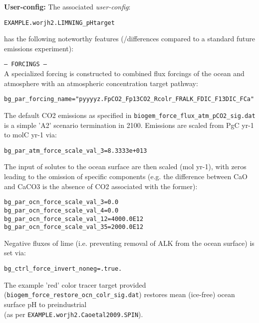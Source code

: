 \documentclass[10pt,twoside]{article}
\begin{document}
\noindent \textbf{User-config:} The associated \textit{user-config}:
\vspace{-10pt}\begin{verbatim}EXAMPLE.worjh2.LIMNING_pHtarget\end{verbatim}\vspace{-10pt}
has the following noteworthy features (/differences compared to a standard future emissions experiment):
\begin{compactitem}
                \item \texttt{--- FORCINGS ---}
                \\ A specialized forcing is constructed to combined flux forcings of the ocean and atmosphere with an atmospheric concentration target pathway:
\vspace{-5pt}\begin{verbatim}
bg_par_forcing_name="pyyyyz.FpCO2_Fp13CO2_Rcolr_FRALK_FDIC_F13DIC_FCa"
                \end{verbatim}\vspace{-5pt}
The default CO2 emissions as specified in \texttt{biogem\_force\_flux\_atm\_pCO2\_sig.dat} is a simple 'A2' scenario termination in 2100. Emissions are scaled from PgC yr-1 to molC yr-1 via:
\vspace{-5pt}\begin{verbatim}
bg_par_atm_force_scale_val_3=8.3333e+013
                \end{verbatim}\vspace{-5pt}
                The input of solutes to the ocean surface are then scaled (mol yr-1), with zeros leading to the omission of specific components (e.g. the difference between CaO and CaCO3 is the absence of CO2 associated with the former):
\vspace{-5pt}\begin{verbatim}
bg_par_ocn_force_scale_val_3=0.0
bg_par_ocn_force_scale_val_4=0.0
bg_par_ocn_force_scale_val_12=4000.0E12
bg_par_ocn_force_scale_val_35=2000.0E12
                \end{verbatim}\vspace{-5pt}
Negative fluxes of lime (i.e. preventing removal of ALK from the ocean surface) is set via:
\vspace{-5pt}\begin{verbatim}
bg_ctrl_force_invert_noneg=.true.
                \end{verbatim}\vspace{-5pt}
                The example 'red' color tracer target provided (\texttt{biogem\_force\_restore\_ocn\_colr\_sig.dat}) restores mean (ice-free) ocean surface pH to preindustrial
                \\(as per \texttt{EXAMPLE.worjh2.Caoetal2009.SPIN}).
        \end{compactitem}
        
\end{document}
